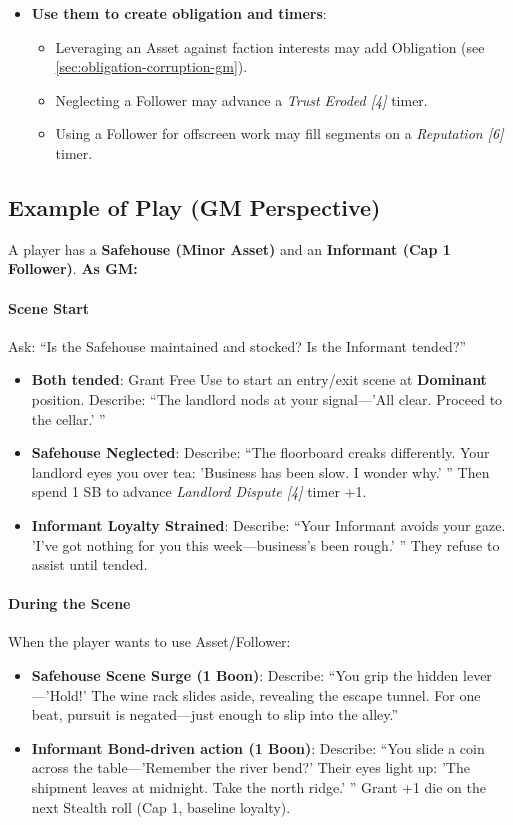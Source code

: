 \begin{itemize}
  \item \textbf{Use them to create obligation and timers}:  
        \begin{itemize}
          \item Leveraging an Asset against faction interests may add Obligation (see \ref{sec:obligation-corruption-gm}).  
          \item Neglecting a Follower may advance a \emph{Trust Eroded [4]} timer.  
          \item Using a Follower for offscreen work may fill segments on a \emph{Reputation [6]} timer.  
        \end{itemize}
\end{itemize}

\subsection*{Example of Play (GM Perspective)}
A player has a \textbf{Safehouse (Minor Asset)} and an \textbf{Informant (Cap 1 Follower)}. \textbf{As GM:}  

\paragraph{Scene Start}
Ask: ``Is the Safehouse maintained and stocked? Is the Informant tended?''  
\begin{itemize}
  \item \textbf{Both tended}: Grant Free Use to start an entry/exit scene at \textbf{Dominant} position. Describe: ``The landlord nods at your signal---'All clear. Proceed to the cellar.' ''  
  \item \textbf{Safehouse Neglected}: Describe: ``The floorboard creaks differently. Your landlord eyes you over tea: 'Business has been slow. I wonder why.' '' Then spend 1 SB to advance \emph{Landlord Dispute [4]} timer +1.  
  \item \textbf{Informant Loyalty Strained}: Describe: ``Your Informant avoids your gaze. 'I've got nothing for you this week---business's been rough.' '' They refuse to assist until tended.  
\end{itemize}

\paragraph{During the Scene}
When the player wants to use Asset/Follower:  
\begin{itemize}
  \item \textbf{Safehouse Scene Surge (1 Boon)}: Describe: ``You grip the hidden lever---'Hold!' The wine rack slides aside, revealing the escape tunnel. For one beat, pursuit is negated---just enough to slip into the alley.''  
  \item \textbf{Informant Bond-driven action (1 Boon)}: Describe: ``You slide a coin across the table---'Remember the river bend?' Their eyes light up: 'The shipment leaves at midnight. Take the north ridge.' '' Grant +1 die on the next Stealth roll (Cap 1, baseline loyalty).  
\end{itemize}

